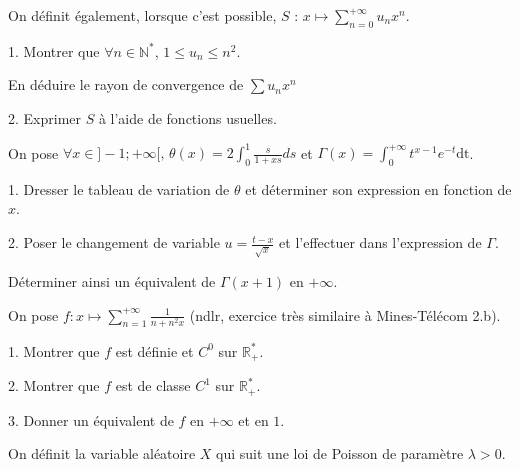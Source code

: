 \noindent On définit également, lorsque c'est possible, $S$ : $\displaystyle x \mapsto \sum_{n = 0}^{+\infty} {u_nx^n}$.

\vspace{5pt}
1. Montrer que $\forall n \in \mathbb{N}^*$, $1 \leqslant u_n \leqslant n^2$.

En déduire le rayon de convergence de $\sum u_nx^n$

\vspace{5pt}
2. Exprimer $S$ à l'aide de fonctions usuelles.



\subetoiles



\noindent On pose $\displaystyle \forall x \in \rbrack -1;+\infty \lbrack,\, \theta(x) = 2 \int_{0}^{1} \frac {s} {1+xs}ds$
et $\displaystyle \Gamma(x) = \int_{0}^{+\infty}t^{x-1}e^{-t}\mathrm{dt}$.

\vspace{5pt}
1. Dresser le tableau de variation de $\theta$ et déterminer son expression en fonction de $x$.

\vspace{5pt}
2. Poser le changement de variable $\displaystyle u = \frac {t-x} {\sqrt{x}}$ et l'effectuer dans l'expression de $\Gamma$.

\vspace{5pt}
Déterminer ainsi un équivalent de $\Gamma(x+1)$ en $+\infty$.



\subetoiles



\noindent On pose $\displaystyle f : x \mapsto \sum_{n=1}^{+\infty} \frac {1} {n + n^2x}$ (ndlr, exercice très similaire à Mines-Télécom 2.b).

\vspace{5pt}
1. Montrer que $f$ est définie et $C^0$ sur $\mathbb{R}_+^*$.

\vspace{5pt}
2. Montrer que $f$ est de classe $C^1$ sur $\mathbb{R}_+^*$.

\vspace{5pt}
3. Donner un équivalent de $f$ en $+\infty$ et en $1$.



\subetoiles
\columnbreak



\noindent On définit la variable aléatoire $X$ qui suit une loi de Poisson de paramètre $\lambda > 0$.

